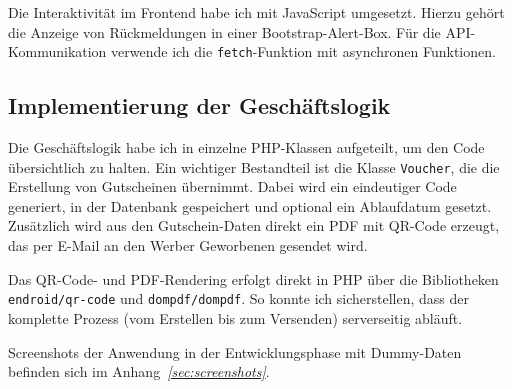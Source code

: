 

Die Interaktivität im Frontend habe ich mit JavaScript umgesetzt. 
Hierzu gehört \zB die Anzeige von Rückmeldungen in einer Bootstrap-Alert-Box.
Für die API-Kommunikation verwende ich die \texttt{fetch}-Funktion mit asynchronen Funktionen.



\subsection{Implementierung der Geschäftslogik}
\label{sec:ImplementierungGeschaeftslogik}

Die Geschäftslogik habe ich in einzelne PHP-Klassen aufgeteilt, um den Code übersichtlich zu halten.
Ein wichtiger Bestandteil ist die Klasse \texttt{Voucher}, die die Erstellung von Gutscheinen übernimmt.
Dabei wird ein eindeutiger Code generiert, in der Datenbank gespeichert und optional ein Ablaufdatum gesetzt.
Zusätzlich wird aus den Gutschein-Daten direkt ein PDF mit QR-Code erzeugt, das per E-Mail an den Werber \bzw Geworbenen gesendet wird.



Das QR-Code- und PDF-Rendering erfolgt direkt in PHP über die Bibliotheken \texttt{endroid/qr-code} und \texttt{dompdf/dompdf}.
So konnte ich sicherstellen, dass der komplette Prozess (vom Erstellen bis zum Versenden) serverseitig abläuft.

Screenshots der Anwendung in der Entwicklungsphase mit Dummy-Daten befinden sich im Anhang~\textit{\ref{sec:screenshots}}.
